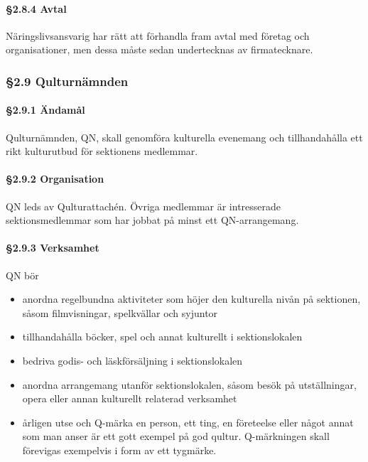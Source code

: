 \paragraph{§2.8.4 Avtal}

Näringslivsansvarig har rätt att förhandla fram avtal med företag och organisationer, men dessa måste sedan undertecknas av firmatecknare.

\subsubsection{§2.9 Qulturnämnden}

\paragraph{§2.9.1 Ändamål}

Qulturnämnden, QN, skall genomföra kulturella evenemang och tillhandahålla ett rikt kulturutbud för sektionens medlemmar.

\paragraph{§2.9.2 Organisation}

QN leds av Qulturattachén. Övriga medlemmar är intresserade sektionsmedlemmar som har jobbat på minst ett QN-arrangemang.

\paragraph{§2.9.3 Verksamhet}

QN bör

\begin{itemize}
  \item anordna regelbundna aktiviteter som höjer den kulturella nivån på sektionen, såsom filmvisningar, spelkvällar och syjuntor
  \item tillhandahålla böcker, spel och annat kulturellt i sektionslokalen
  \item bedriva godis- och läskförsäljning i sektionslokalen
  \item anordna arrangemang utanför sektionslokalen, såsom besök på utställningar, opera eller annan kulturellt relaterad verksamhet
  \item årligen utse och Q-märka en person, ett ting, en företeelse eller något annat som man anser är ett gott exempel på god qultur. Q-märkningen skall förevigas exempelvis i form av ett tygmärke.
\end{itemize}

